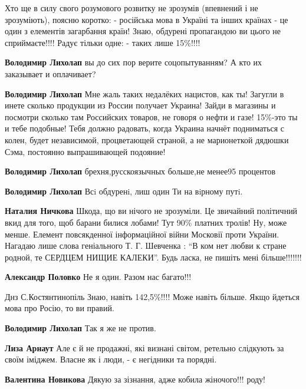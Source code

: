 
Хто ще в силу свого розумового розвитку не зрозумів (впевнений і не
зрозуміють), поясню коротко: - російська мова в Україні та інших країнах - це
один з елементів загарбання країн! Знаю, обдурені пропагандою ви цього не
сприймаєте!!!! Радує тільки одне: - таких лише 15\%!!!!

\begin{itemize}

\textbf{Володимир Лихолап} вы до сих пор верите соцопытуванням? А кто их заказывает и оплачивает?


\textbf{Володимир Лихолап} Мне жаль таких недалёких нацистов, как ты! Загугли в
инете сколько продукции из России получает Украина! Зайди в магазины и посмотри
сколько там Российских товаров, не говоря о нефти и газе! 15\%-это ты и тебе
подобные! Тебя должно радовать, когда Украина начнёт подниматься с колен, будет
независимой, процветающей страной, а не марионеткой дядюшки Сэма, постоянно
выпрашивающей подояние!

\textbf{Володимир Лихолап} брехня,русскоязычных больше,не менее95 процентов

\textbf{Володимир Лихолап} Всi обдуренi, лиш один Ти на вiрному путi.

\textbf{Наталия Ничкова} Шкода, що ви нічого не зрозуміли. Це звичайний політичний вкид
для того, щоб барани билися лобами! Тут 90\% платних тролів! Ну, може менше.
Елемент повсякденної інформаційної війни Московії проти України. Нагадаю лише
слова геніального Т. Г. Шевченка : \enquote{В ком нет любви к стране родной, те СЕРДЦЕМ
НИЩИЕ КАЛЕКИ}. Будь ласка, не пишіть мені більше!!!!!!!

\textbf{Александр Половко} Не я один. Разом нас багато!!!


Днз С.Костянтинопіль Знаю, навіть 142,5\%!!!! Може навіть більше. Якщо йдеться мова про Росію, то ви правий.

\textbf{Володимир Лихолап} Так я же не против.

\textbf{Лиза Арнаут} Але є й не продажні, які визнані світом, ретельно слідкують за своїм іміджем. Власне як і люди, - є негідники та порядні.

\textbf{Валентина Новикова} Дякую за зізнання, адже кобила жіночого!!! роду!


\end{itemize}
